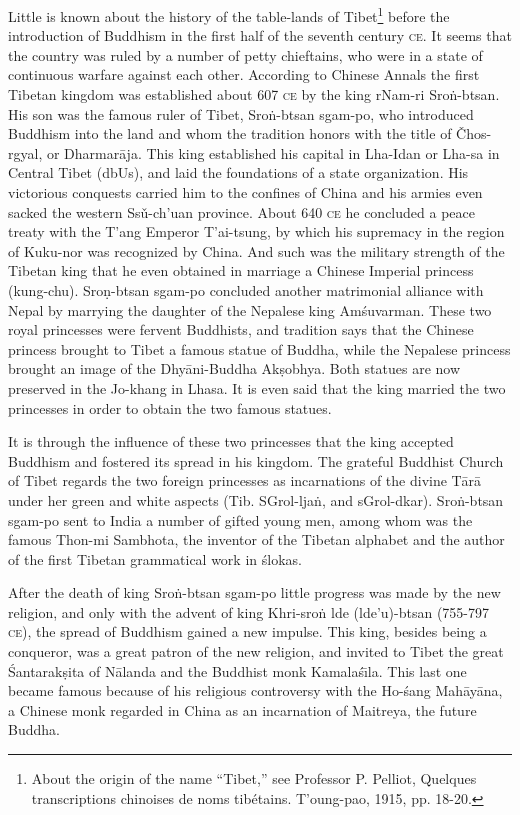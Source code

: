\documentclass[a4paper, 12pt, oneside]{article}
\begin{document}
Little is known about the history of the table-lands of Tibet\footnote{About the origin of the name ``Tibet,'' see Professor P. Pelliot, Quelques transcriptions chinoises de noms tibétains. T'oung-pao, 1915, pp. 18-20.} before the introduction of Buddhism in the first half of the seventh century \textsc{ce}. It seems that the country was ruled by a number of petty chieftains, who were in a state of continuous warfare against each other. According to Chinese Annals the first Tibetan kingdom was established about 607 \textsc{ce} by the king rNam-ri Sro\.{n}-btsan. His son was the famous ruler of Tibet, Sro\.{n}-btsan sgam-po, who introduced Buddhism into the land and whom the tradition honors with the title of Čhos-rgyal, or Dharmar\={a}ja. This king established his capital in Lha-Idan or Lha-sa in Central Tibet (dbUs), and laid the foundations of a state organization. His victorious conquests carried him to the confines of China and his armies even sacked the western Ssǔ-ch'uan province. About 640 \textsc{ce} he concluded a peace treaty with the T'ang Emperor T'ai-tsung, by which his supremacy in the region of Kuku-nor was recognized by China. And such was the military strength of the Tibetan king that he even obtained in marriage a Chinese Imperial princess (kung-chu). Sro\d{n}-btsan sgam-po concluded another matrimonial alliance with Nepal by marrying the daughter of the Nepalese king Am\'{s}uvarman. These two royal princesses were fervent Buddhists, and tradition says that the Chinese princess brought to Tibet a famous statue of Buddha, while the Nepalese princess brought an image of the Dhy\={a}ni-Buddha Ak\d{s}obhya. Both statues are now preserved in the Jo-khang in Lhasa. It is even said that the king married the two princesses in order to obtain the two famous statues.

It is through the influence of these two princesses that the king accepted Buddhism and fostered its spread in his kingdom. The grateful Buddhist Church of Tibet regards the two foreign princesses as incarnations of the divine T\={a}r\={a} under her green and white aspects (Tib. SGrol-lja\.{n}, and sGrol-dkar). Sro\.{n}-btsan sgam-po sent to India a number of gifted young men, among whom was the famous Thon-mi Sambhota, the inventor of the Tibetan alphabet and the author of the first Tibetan grammatical work in \'{s}lokas.

After the death of king Sro\.{n}-btsan sgam-po little progress was made by the new religion, and only with the advent of king Khri-sro\.{n} lde (lde'u)-btsan (755-797 \textsc{ce}), the spread of Buddhism gained a new impulse. This king, besides being a conqueror, was a great patron of the new religion, and invited to Tibet the great \'{S}antarak\d{s}ita of N\={a}landa and the Buddhist monk Kamala\'{s}\={\i}la. This last one became famous because of his religious controversy with the Ho-\'{s}ang Mah\={a}y\={a}na, a Chinese monk regarded in China as an incarnation of Maitreya, the future Buddha.
\end{document}
